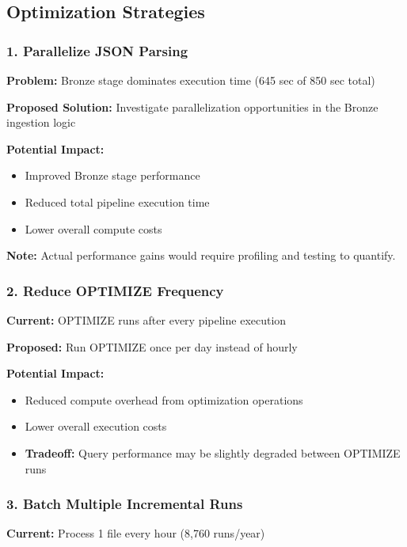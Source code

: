 \documentclass[11pt,a4paper]{article}
\begin{document}
\subsection{Optimization Strategies}

\subsubsection{1. Parallelize JSON Parsing}

\textbf{Problem:} Bronze stage dominates execution time (645 sec of 850 sec total)

\textbf{Proposed Solution:} Investigate parallelization opportunities in the Bronze ingestion logic

\textbf{Potential Impact:}
\begin{itemize}
    \item Improved Bronze stage performance
    \item Reduced total pipeline execution time
    \item Lower overall compute costs
\end{itemize}

\textbf{Note:} Actual performance gains would require profiling and testing to quantify.

\subsubsection{2. Reduce OPTIMIZE Frequency}

\textbf{Current:} OPTIMIZE runs after every pipeline execution

\textbf{Proposed:} Run OPTIMIZE once per day instead of hourly

\textbf{Potential Impact:}
\begin{itemize}
    \item Reduced compute overhead from optimization operations
    \item Lower overall execution costs
    \item \textbf{Tradeoff:} Query performance may be slightly degraded between OPTIMIZE runs
\end{itemize}

\subsubsection{3. Batch Multiple Incremental Runs}

\textbf{Current:} Process 1 file every hour (8,760 runs/year)
\end{document}

